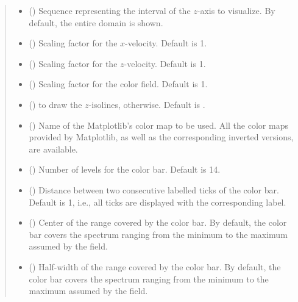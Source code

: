 \documentclass[letterpaper,10pt,english]{sphinxmanual}
\begin{document}
\begin{fulllineitems}
\begin{quote}
\begin{description}
\begin{itemize}
\item {} 
 () \textendash{} Sequence representing the interval of the \(z\)-axis to visualize.
By default, the entire domain is shown.

\item {} 
 () \textendash{} Scaling factor for the \(x\)-velocity. Default is 1.

\item {} 
 () \textendash{} Scaling factor for the \(z\)-velocity. Default is 1.

\item {} 
 () \textendash{} Scaling factor for the color field. Default is 1.

\item {} 
 () \textendash{}  to draw the \(z\)-isolines,  otherwise. Default is .

\item {} 
 () \textendash{} Name of the Matplotlib’s color map to be used. All the color maps provided by Matplotlib,
as well as the corresponding inverted versions, are available.

\item {} 
 () \textendash{} Number of levels for the color bar. Default is 14.

\item {} 
 () \textendash{} Distance between two consecutive labelled ticks of the color bar. Default is 1, i.e.,
all ticks are displayed with the corresponding label.

\item {} 
 () \textendash{} Center of the range covered by the color bar. By default, the color bar covers the spectrum
ranging from the minimum to the maximum assumed by the field.

\item {} 
 () \textendash{} Half-width of the range covered by the color bar. By default, the color bar covers the spectrum
ranging from the minimum to the maximum assumed by the field.


\end{itemize}
\end{description}
\end{quote}
\end{fulllineitems}
\end{document}
